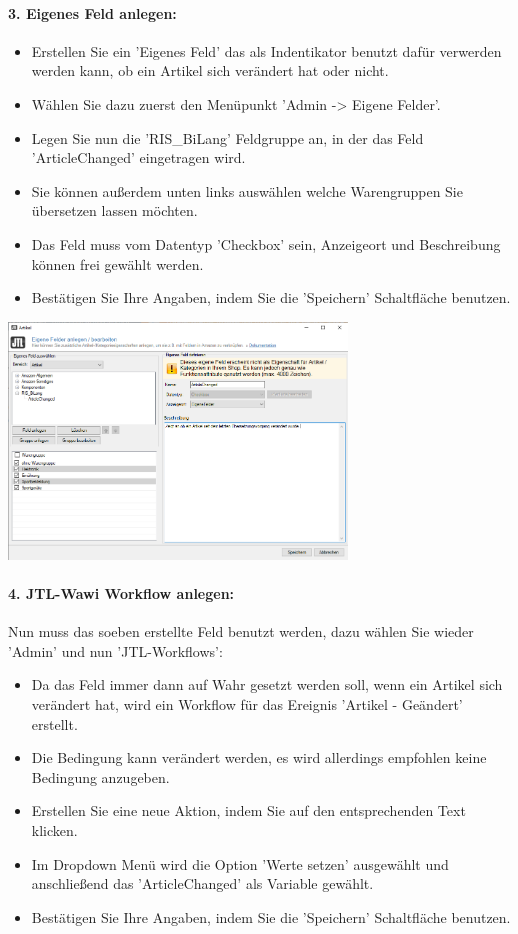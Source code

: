\paragraph{3. Eigenes Feld anlegen:}
\begin{itemize}
	\item Erstellen Sie ein 'Eigenes Feld' das als Indentikator benutzt dafür verwerden werden kann, ob ein Artikel sich verändert hat oder nicht. 
	\item Wählen Sie dazu zuerst den Menüpunkt 'Admin -> Eigene Felder'.
	\item Legen Sie nun die 'RIS\_BiLang' Feldgruppe an, in der das Feld 'ArticleChanged' eingetragen wird. 
	\item Sie können außerdem unten links auswählen welche Warengruppen Sie übersetzen lassen möchten.
	\item Das Feld muss vom Datentyp 'Checkbox' sein, Anzeigeort und Beschreibung können frei gewählt werden.
	\item Bestätigen Sie Ihre Angaben, indem Sie die 'Speichern' Schaltfläche benutzen.
\end{itemize}

\begin{center}
	\includegraphics[width=9cm]{./img/eigenesFeld.png}
\end{center}

\paragraph{4. JTL-Wawi Workflow anlegen:}
Nun muss das soeben erstellte Feld benutzt werden, dazu wählen Sie wieder 'Admin' und nun 'JTL-Workflows':

\begin{itemize}
	\item Da das Feld immer dann auf Wahr gesetzt werden soll, wenn ein Artikel sich verändert hat, wird ein Workflow für das Ereignis 'Artikel - Geändert' erstellt.
	\item Die Bedingung kann verändert werden, es wird allerdings empfohlen keine Bedingung anzugeben.
	\item Erstellen Sie eine neue Aktion, indem Sie auf den entsprechenden Text klicken.
	\item Im Dropdown Menü wird die Option 'Werte setzen' ausgewählt und anschließend das 'ArticleChanged' als Variable gewählt.
	\item Bestätigen Sie Ihre Angaben, indem Sie die 'Speichern' Schaltfläche benutzen.
\end{itemize}
	
